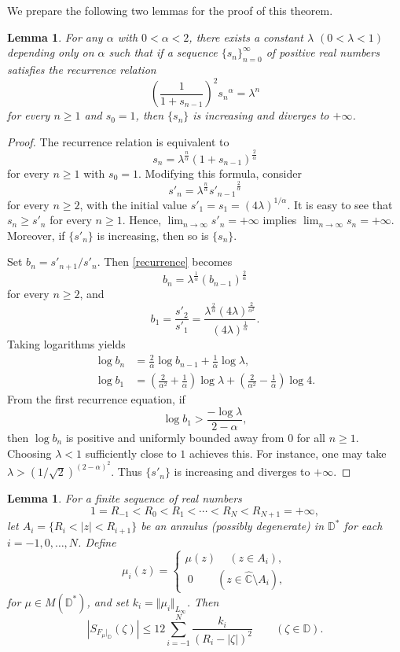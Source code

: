 \documentclass[amstex]{amsart}
\newtheorem{lemma}[theorem]{Lemma}
\theoremstyle{definition}
\theoremstyle{remark}
\numberwithin{equation}{section}
\begin{document}
We prepare the following two lemmas for the proof of this theorem.

\begin{lemma}\label{recurrencelemma}
For any $\alpha$ with $0< \alpha < 2$,
there exists a constant $\lambda$ $(0 < \lambda <1)$ depending only on $\alpha$ such that
if a sequence $\{s_n\}_{n=0}^\infty$ of positive real numbers satisfies the recurrence relation
$$
\left(\frac{1}{1+s_{n-1}} \right)^2 {s_n}^\alpha=\lambda^n 
$$
for every $n \geq 1$ and $s_0=1$, 
then $\{s_n\}$ is increasing and diverges to $+\infty$.
\end{lemma}

\begin{proof}
The recurrence relation is equivalent to
$$
s_n=\lambda^{\frac{n}{\alpha}}(1+s_{n-1})^{\frac{2}{\alpha}}
$$
for every $n \geq 1$ with $s_0=1$. Modifying this formula, consider
\begin{equation}\label{recurrence}
s'_n=\lambda^{\frac{n}{\alpha}}{s'_{n-1}}^{\frac{2}{\alpha}}
\end{equation}
for every $n \geq 2$, with the initial value $s'_1=s_1=(4\lambda)^{1/\alpha}$.
It is easy to see that $s_n \geq s'_n$ for every $n \geq 1$. Hence,
$\lim_{n \to \infty} s'_n=+\infty$ implies $\lim_{n \to \infty} s_n=+\infty$.
Moreover, if $\{s'_n\}$ is increasing, then so is $\{s_n\}$.

Set $b_n=s'_{n+1}/s'_n$. Then \eqref{recurrence} becomes
$$
b_n=\lambda^{\frac{1}{\alpha}} (b_{n-1})^{\frac{2}{\alpha}}
$$
for every $n \geq 2$, and 
$$
b_1=\frac{s'_2}{s'_1}=\frac{\lambda^{\frac{2}{\alpha}}(4\lambda)^{\frac{2}{\alpha^2}}}{(4\lambda)^{\frac{1}{\alpha}}}.
$$
Taking logarithms yields
\begin{align*}
\log b_n&=\frac{2}{\alpha} \log b_{n-1} +\frac{1}{\alpha} \log\lambda,\\
\log b_1&=\left(\frac{2}{\alpha^2}+\frac{1}{\alpha}\right) \log \lambda+
\left(\frac{2}{\alpha^2}-\frac{1}{\alpha}\right)\log 4.
\end{align*}
From the first recurrence equation, if
$$
\log b_1 > \frac{-\log \lambda}{2-\alpha},
$$
then $\log b_n$ is positive and uniformly bounded away from $0$ for all $n \geq 1$.
Choosing $\lambda<1$ sufficiently close to $1$ achieves this.
For instance, one may take 
$\lambda>(1/\sqrt{2})^{(2-\alpha)^2}$.
Thus $\{s'_n\}$ is increasing and diverges to $+\infty$.
\end{proof}

\begin{lemma}\label{decomposition}
For a finite sequence of real numbers
$$
1=R_{-1}<R_0<R_1< \cdots <R_{N}<R_{N+1}=+\infty,
$$
let $A_i=\{R_i < |z| < R_{i+1}\}$ be an annulus (possibly degenerate)
in $\mathbb D^*$ 
for each $i=-1,0,\ldots,N$.  
Define
$$
\mu_i(z)=\left\{
\begin{array}{l} \mu(z) \,\quad (z \in A_i),\\[2pt]
\ 0  \qquad\, (z \in \widehat{\mathbb C} \setminus A_i),
\end{array}
\right.
$$ 
for $\mu \in M(\mathbb D^*)$, and set $k_i=\Vert \mu_i \Vert_{L_\infty}$. Then
$$
|S_{F_\mu|_\mathbb D}(\zeta)| 
\leq 12 \sum_{i=-1}^{N} \frac{k_i}{(R_i-|\zeta|)^2} \qquad (\zeta \in \mathbb D).
$$
\end{lemma}
\end{document}
